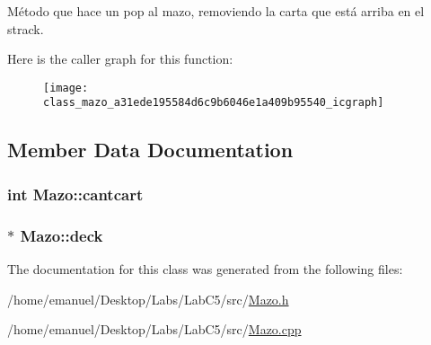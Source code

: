 Método que hace un pop al mazo, removiendo la carta que está arriba en el strack. 



Here is the caller graph for this function\+:
\nopagebreak
\begin{figure}[H]
\begin{center}
\leavevmode
\texttt{[image: class\_mazo\_a31ede195584d6c9b6046e1a409b95540\_icgraph]}
\end{center}
\end{figure}




\subsection{Member Data Documentation}
\hypertarget{class_mazo_af10f2aeda8faed14cbb7b0ad9febd126}{
\subsubsection[{cantcart}]{\setlength{\rightskip}{0pt plus 5cm}int Mazo\+::cantcart}}\label{class_mazo_af10f2aeda8faed14cbb7b0ad9febd126}
\hypertarget{class_mazo_a695987bdf77145b16494fa8dbd606d11}{
\subsubsection[{deck}]{$\ast$ Mazo\+::deck}}\label{class_mazo_a695987bdf77145b16494fa8dbd606d11}


The documentation for this class was generated from the following files\+:\begin{DoxyCompactItemize}
\item 
/home/emanuel/\+Desktop/\+Labs/\+Lab\+C5/src/\hyperlink{_mazo_8h}{Mazo.\+h}\item 
/home/emanuel/\+Desktop/\+Labs/\+Lab\+C5/src/\hyperlink{_mazo_8cpp}{Mazo.\+cpp}\end{DoxyCompactItemize}
